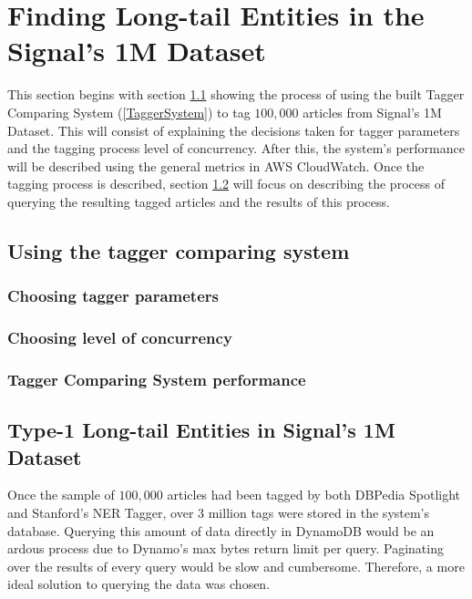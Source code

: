 \section{Finding Long-tail Entities in the Signal's 1M Dataset}\label{Contrib:LongTailInSignal}
This section begins with section \ref{TaggingSignal} showing the process of using the built Tagger Comparing System (\ref{TaggerSystem}) to tag $100,000$ articles from Signal's 1M Dataset.
This will consist of explaining the decisions taken for tagger parameters and the tagging process level of concurrency.
After this, the system's performance will be described using the general metrics in AWS CloudWatch\cite{aws_cloudwatch}.
Once the tagging process is described, section \ref{ResultsSignal} will focus on describing the process of querying the resulting tagged articles and the results of this process. 

\subsection{Using the tagger comparing system}\label{TaggingSignal}

\subsubsection{Choosing tagger parameters}

\subsubsection{Choosing level of concurrency}

\subsubsection{Tagger Comparing System performance}

\subsection{Type-1 Long-tail Entities in Signal's 1M Dataset} \label{ResultsSignal}
Once the sample of $100,000$ articles had been tagged by both DBPedia Spotlight and Stanford's NER Tagger,
over 3 million tags were stored in the system's database.
Querying this amount of data directly in DynamoDB would be an ardous process due to Dynamo's max bytes return limit per query.
Paginating over the results of every query would be slow and cumbersome.
Therefore, a more ideal solution to querying the data was chosen.

